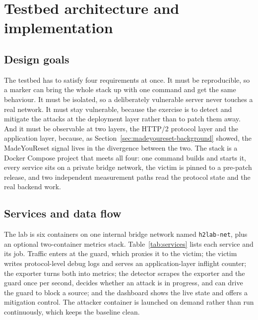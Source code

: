 \documentclass[a4paper,fleqn]{cas-dc}
\begin{document}
\section{Testbed architecture and implementation}\label{sec:testbed}

\subsection{Design goals}\label{sec:testbed-goals}

The testbed has to satisfy four requirements at once. It must be reproducible, so a marker can bring the whole stack up with one command and get the same behaviour. It must be isolated, so a deliberately vulnerable server never touches a real network. It must stay vulnerable, because the exercise is to detect and mitigate the attacks at the deployment layer rather than to patch them away. And it must be observable at two layers, the HTTP/2 protocol layer and the application layer, because, as Section~\ref{sec:madeyoureset-background} showed, the MadeYouReset signal lives in the divergence between the two. The stack is a Docker Compose project that meets all four: one command builds and starts it, every service sits on a private bridge network, the victim is pinned to a pre-patch release, and two independent measurement paths read the protocol state and the real backend work.

\subsection{Services and data flow}\label{sec:services}

The lab is six containers on one internal bridge network named \texttt{h2lab-net}, plus an optional two-container metrics stack. Table~\ref{tab:services} lists each service and its job. Traffic enters at the guard, which proxies it to the victim; the victim writes protocol-level debug logs and serves an application-layer inflight counter; the exporter turns both into metrics; the detector scrapes the exporter and the guard once per second, decides whether an attack is in progress, and can drive the guard to block a source; and the dashboard shows the live state and offers a mitigation control. The attacker container is launched on demand rather than run continuously, which keeps the baseline clean.
\end{document}
